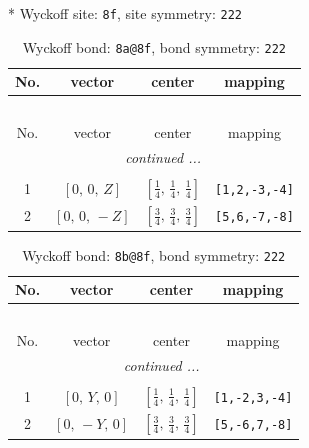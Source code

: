 \documentclass[fleqn,8pt]{jsarticle}
\begin{document}
* Wyckoff site: {\tt 8f}, site symmetry: {\tt 222}
\renewcommand{\arraystretch}{1.2}
\begin{longtable}{cccc}
\caption{Wyckoff bond: {\tt 8a@8f}, bond symmetry: {\tt 222}}
 \\
 \hline \hline
No. & vector & center & mapping \\ \hline \endfirsthead

\multicolumn{3}{l}{\tablename\ \thetable{}} \\
 \hline \hline
No. & vector & center & mapping \\ \hline \endhead

 \hline \hline
\multicolumn{3}{r}{\footnotesize\it continued ...} \\ \endfoot

 \hline \hline
\multicolumn{3}{r}{} \\ \endlastfoot

1 & $\left[ 0,\, 0,\, Z \right]$ & $\left[ \frac{1}{4},\, \frac{1}{4},\, \frac{1}{4} \right]$ & {\tt [1,2,-3,-4]} \\ \hline
2 & $\left[ 0,\, 0,\, - Z \right]$ & $\left[ \frac{3}{4},\, \frac{3}{4},\, \frac{3}{4} \right]$ & {\tt [5,6,-7,-8]} \\
\end{longtable}
\renewcommand{\arraystretch}{1.2}
\begin{longtable}{cccc}
\caption{Wyckoff bond: {\tt 8b@8f}, bond symmetry: {\tt 222}}
 \\
 \hline \hline
No. & vector & center & mapping \\ \hline \endfirsthead

\multicolumn{3}{l}{\tablename\ \thetable{}} \\
 \hline \hline
No. & vector & center & mapping \\ \hline \endhead

 \hline \hline
\multicolumn{3}{r}{\footnotesize\it continued ...} \\ \endfoot

 \hline \hline
\multicolumn{3}{r}{} \\ \endlastfoot

1 & $\left[ 0,\, Y,\, 0 \right]$ & $\left[ \frac{1}{4},\, \frac{1}{4},\, \frac{1}{4} \right]$ & {\tt [1,-2,3,-4]} \\ \hline
2 & $\left[ 0,\, - Y,\, 0 \right]$ & $\left[ \frac{3}{4},\, \frac{3}{4},\, \frac{3}{4} \right]$ & {\tt [5,-6,7,-8]} \\
\end{longtable}
\renewcommand{\arraystretch}{1.2}
\end{document}
